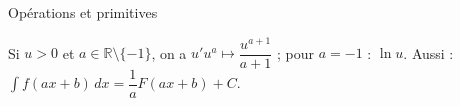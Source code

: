 \documentclass[10pt,a4paper,landscape]{article}
\newcommand{\R}{\mathbb{R}}
\begin{document}
\begin{minipage}[t]{0.495\textwidth}
\begin{cbox}{Opérations et primitives}
\smallskip
\raggedright Si $u>0$ et $a\in\R\setminus\{-1\}$, on a $u'u^a\mapsto\dfrac{u^{a+1}}{a+1}$ ; pour $a=-1$ : $\ln u$. Aussi : $\displaystyle\int f(ax+b)\,dx=\dfrac1aF(ax+b)+C$.
\end{cbox}

\end{minipage}
\end{document}
